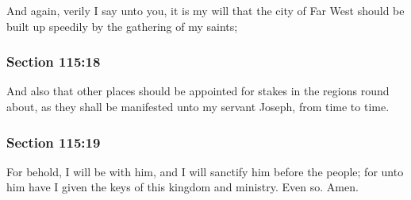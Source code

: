 		And again, verily I say unto you, it is my will that the city of Far West should be built up speedily by the gathering of my saints;


	\subsubsection{Section 115:18} %
		\label{DC115-18}

		And also that other places should be appointed for stakes in the regions round about, as they shall be manifested unto my servant Joseph, from time to time.


	\subsubsection{Section 115:19} %
		\label{DC115-19}

		For behold, I will be with him, and I will sanctify him before the people; for unto him have I given the keys of this kingdom and ministry.  Even so.  Amen.

